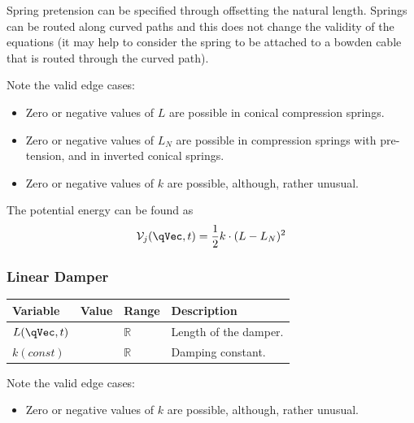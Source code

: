 \documentclass[11pt]{article}
\begin{document}
Spring pretension can be specified through offsetting the natural length. Springs can be routed along curved paths and this does not change the validity of the equations (it may help to consider the spring to be attached to a bowden cable that is routed through the curved path).

Note the valid edge cases:
\begin{itemize}\setlength{\parskip}{0em}
    \item Zero or negative values of $L$ are possible in conical compression springs.
    \item Zero or negative values of $L_N$ are possible in compression springs with pre-tension, and in inverted conical springs.
    \item Zero or negative values of $k$ are possible, although, rather unusual.
\end{itemize}

The potential energy can be found as
\begin{equation}
    \mathcal{V}_j(\qVec, t) = \frac{1}{2} k \cdot (L-L_N)^2
\end{equation}


\subsubsection{Linear Damper} \label{ssec:d:elements:damper}
\begin{center}
\begin{threeparttable}
\begin{tabular}{llll}
    \textbf{Variable} & \textbf{Value} & \textbf{Range} & \textbf{Description}\\
    \hline
    $L(\qVec, t)$
        &
        & $\mathbb{R}$
        & Length of the damper. \\
    $k(const)$
        &
        & $\mathbb{R}$
        & Damping constant. \\
\end{tabular}
\end{threeparttable}
\end{center}

Note the valid edge cases:
\begin{itemize}
    \item Zero or negative values of $k$ are possible, although, rather unusual.
\end{itemize}
\end{document}
